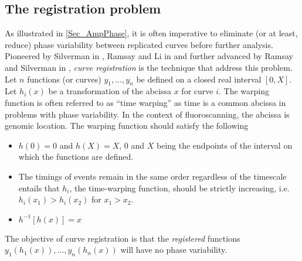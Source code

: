 \subsection{The registration problem}
As illustrated in \ref{Sec_AmpPhase}, it is often imperative to eliminate (or at least, reduce) phase variability between  replicated curves before further analysis. Pioneered by Silverman in \cite{Silverman_1995_JRSSB}, Ramsay and Li in \cite{Ramsay_Li_1998_JRSSB} and further advanced by Ramsay and Silverman in \cite{Ramsay_2006_Functional}, {\emph{curve registration}} is the technique that address this problem. Let $n$ functions (or curves) $y_1, \dots, y_n$ be defined on a closed real interval $[0, X]$. Let $h_i(x)$ be a transformation of the abcissa $x$ for curve $i$. The warping function is often referred to as ``time warping'' as time is a common abcissa in problems with phase variability. In the context of fluoroscanning, the abcissa is genomic location. The warping function should satisfy the following
\begin{itemize}
\item $h(0) = 0$ and $h(X) = X$, $0$ and $X$ being the endpoints of the interval on which the functions are defined.
\item The timings of events remain in the same order regardless of the timescale entails that $h_i$, the time-warping function, should be strictly increasing, i.e. $h_i(x_1) > h_i(x_2)$ for $x_1 > x_2$. 
\item $h^{-1}[h(x)] = x$
\end{itemize}
The objective of curve registration is that the {\emph{registered}} functions $y_1(h_1(x)), \dots, y_n(h_n(x))$ will have no phase variability. 


